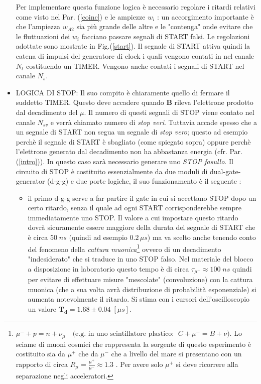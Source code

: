 \documentclass[12pt,a4paper,openright,twoside]{article}
\numberwithin{equation}{section} %
\begin{document}
\begin{itemize}
 Per implementare questa funzione logica è necessario regolare i ritardi relativi come visto nel Par. (\ref{coinc}) e le ampiezze $w_i$ : un accorgimento importante è che l'ampiezza $w_{A2}$ sia più grande delle altre e le "contenga" onde evitare che le fluttuazioni dei $w_i$ facciano passare segnali di START falsi. Le regolazioni adottate sono mostrate in Fig.(\ref{start}). Il segnale di START attiva quindi la catena di impulsi del generatore di clock i quali vengono contati in nel canale $N_t$ costituendo un TIMER. Vengono anche contati i segnali di START nel canale $N_s$.
\item LOGICA DI STOP: Il suo compito è chiaramente quello di fermare il suddetto TIMER. Questo deve accadere quando \textbf{B} rileva l'elettrone prodotto dal decadimento del $\mu$. Il numero di questi segnali di STOP viene contato nel canale $N_{sv}$ e verrà chiamato numero di \textit{stop veri}. Tuttavia accade spesso che a un segnale di START non segua un segnale di \textit{stop vero}; questo ad esempio perchè il segnale di START è sbagliato (come spiegato sopra) oppure perchè l'elettrone generato dal decadimento non ha abbastanza energia (cfr. Par.(\ref{intro})). In questo caso sarà necessario generare uno \textit{STOP fasullo}. Il circuito di STOP  è costituito essenzialmente da due moduli di dual-gate-generator  (d-g-g) e due porte logiche, il suo funzionamento è il seguente :
\begin{itemize}
\item il primo d-g-g serve a far partire il gate in cui si accettano STOP dopo un certo ritardo, senza il quale ad ogni START corrisponderebbe sempre immediatamente uno STOP. Il valore a cui impostare questo ritardo dovrà sicuramente essere maggiore della durata del segnale di START che è circa $50 \; ns$ (quindi ad esempio $0.2 \, \mu s$) ma va scelto anche tenendo conto del fenomeno della \textit{cattura muonica}\footnote{$\mu ^- + p = n + \nu_{\mu} \quad \text{(e.g. in uno scintillatore plastico: }\; C+\mu^- = B + \nu \text{)}$. Lo sciame di muoni cosmici che rappresenta la sorgente di questo esperimento è costituito sia da $\mu^+$ che da $\mu^-$ che a livello del mare si presentano con un rapporto di circa $R_{\mu}=\frac{\mu ^+}{\mu ^-} \approx 1.3$ . Per avere solo $\mu ^ +$ si deve ricorrere alla separazione negli acceleratori.} ovvero di un decadimento "indesiderato" che si traduce in uno STOP falso. Nel materiale del blocco a disposizione in laboratorio questo tempo è di circa $\tau_{\mu^-} \approx 100 \; ns$ quindi per evitare di effettuare misure "mescolate" (convoluzione) con la cattura muonica (che a sua volta avrà distribuzione di probabilità esponenziale) si aumenta notevolmente il ritardo. Si stima con i cursori dell'oscilloscopio un valore $\mathbf{T_{d}}=1.68 \pm 0.04 \; [\mu s]$.


\end{itemize}
\end{itemize}
\end{document}
